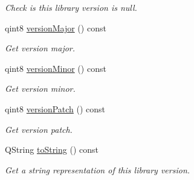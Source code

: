 \begin{DoxyCompactItemize}
\begin{DoxyCompactList}\small\item\em Check is this library version is null. \end{DoxyCompactList}\item 
qint8 \hyperlink{class_mdt_1_1_deploy_utils_1_1_library_version_a12ad69de5e906500584d7c6f84c1f4b3}{version\+Major} () const \hypertarget{class_mdt_1_1_deploy_utils_1_1_library_version_a12ad69de5e906500584d7c6f84c1f4b3}{}\label{class_mdt_1_1_deploy_utils_1_1_library_version_a12ad69de5e906500584d7c6f84c1f4b3}

\begin{DoxyCompactList}\small\item\em Get version major. \end{DoxyCompactList}\item 
qint8 \hyperlink{class_mdt_1_1_deploy_utils_1_1_library_version_a5974023e15b6810679f88ed1c0f8cd89}{version\+Minor} () const \hypertarget{class_mdt_1_1_deploy_utils_1_1_library_version_a5974023e15b6810679f88ed1c0f8cd89}{}\label{class_mdt_1_1_deploy_utils_1_1_library_version_a5974023e15b6810679f88ed1c0f8cd89}

\begin{DoxyCompactList}\small\item\em Get version minor. \end{DoxyCompactList}\item 
qint8 \hyperlink{class_mdt_1_1_deploy_utils_1_1_library_version_a28dd254e9f168d136f8938d6f8860e08}{version\+Patch} () const \hypertarget{class_mdt_1_1_deploy_utils_1_1_library_version_a28dd254e9f168d136f8938d6f8860e08}{}\label{class_mdt_1_1_deploy_utils_1_1_library_version_a28dd254e9f168d136f8938d6f8860e08}

\begin{DoxyCompactList}\small\item\em Get version patch. \end{DoxyCompactList}\item 
Q\+String \hyperlink{class_mdt_1_1_deploy_utils_1_1_library_version_a3fb89e24a243d660084fdd618d7c3054}{to\+String} () const \hypertarget{class_mdt_1_1_deploy_utils_1_1_library_version_a3fb89e24a243d660084fdd618d7c3054}{}\label{class_mdt_1_1_deploy_utils_1_1_library_version_a3fb89e24a243d660084fdd618d7c3054}

\begin{DoxyCompactList}\small\item\em Get a string representation of this library version. \end{DoxyCompactList}\end{DoxyCompactItemize}


